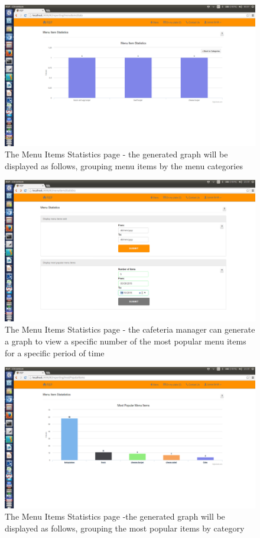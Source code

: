 \documentclass[a4paper,12pt]{report}
\begin{document}
\begin{figure}[H]
  \centering
    \includegraphics[width=1.0\textwidth]{screenshots/menuStats25.png}
    \caption{The Menu Items Statistics page - the generated graph will be displayed as follows, grouping menu items by the menu categories}
\end{figure} 
 
\begin{figure}[H]
  \centering
    \includegraphics[width=1.0\textwidth]{screenshots/menuStats3.png}
    \caption{The Menu Items Statistics page - the cafeteria manager can generate a graph to view a specific number of the most popular menu items for a specific period of time}
\end{figure}

\begin{figure}[H]
  \centering
    \includegraphics[width=1.0\textwidth]{screenshots/menuStats4.png}
    \caption{The Menu Items Statistics page -the generated graph will be displayed as follows, grouping the most popular items by category}
\end{figure}
\end{document}
